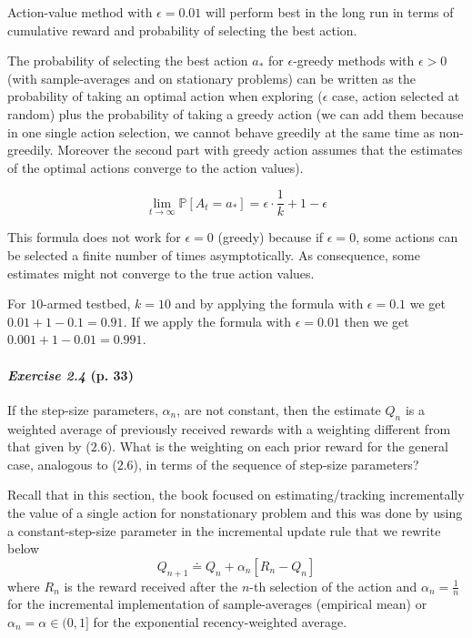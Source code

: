 \documentclass[10pt,a4paper]{article}
\begin{document}
\bigskip
Action-value method with $\epsilon=0.01$ will perform best in the long run in terms of cumulative reward and probability of selecting the best action.

The probability of selecting the best action $a_*$ for $\epsilon$-greedy methods with $\epsilon > 0$ (with sample-averages and on stationary problems) can be written as the probability of taking an optimal action when exploring ($\epsilon$ case, action selected at random) plus the probability of taking a greedy action (we can add them because in one single action selection, we cannot behave greedily at the same time as non-greedily. Moreover the second part with greedy action assumes that the estimates of the optimal actions converge to the action values).

\begin{equation}
\lim_{t\to\infty}\mathbb{P}[A_t = a_*] = \epsilon\cdot\frac{1}{k}+ 1 - \epsilon
\end{equation}

This formula does not work for $\epsilon = 0$ (greedy) because if $\epsilon=0$, some actions can be selected a finite number of times asymptotically. As consequence, some estimates might not converge to the true action values.

For $10$-armed testbed, $k=10$ and by applying the formula with $\epsilon=0.1$ we get $0.01 + 1 - 0.1 = 0.91$. If we apply the formula with $\epsilon=0.01$ then we get $0.001 + 1 - 0.01 = 0.991$.


\paragraph{\textit{Exercise 2.4} (p. 33)} If the step-size parameters, $\alpha_n$, are not constant, then the estimate $Q_n$ is
a weighted average of previously received rewards with a weighting different from that
given by ($2.6$). What is the weighting on each prior reward for the general case, analogous
to ($2.6$), in terms of the sequence of step-size parameters?

\bigskip
Recall that in this section, the book focused on estimating/tracking incrementally the value of a single action for nonstationary problem and this was done by using a constant-step-size parameter in the incremental update rule that we rewrite below
\begin{equation}
Q_{n+1} \doteq Q_n + \alpha_n [R_n - Q_n]
\end{equation}
where $R_n$ is the reward received after the $n$-th selection of the action and $\alpha_n=\frac{1}{n}$ for the incremental implementation of sample-averages (empirical mean) or $\alpha_n=\alpha \in (0, 1]$ for the exponential recency-weighted average.
\end{document}
